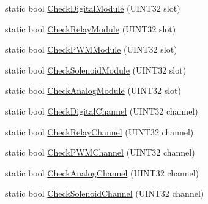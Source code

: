 \begin{DoxyCompactItemize}
\item 
static bool \hyperlink{classSensorBase_a0a3490a89f61ba323a7b1a2a3fe163be}{\-Check\-Digital\-Module} (\-U\-I\-N\-T32 slot)
\item 
static bool \hyperlink{classSensorBase_aa9055a030e59812f3a406c5a41366f23}{\-Check\-Relay\-Module} (\-U\-I\-N\-T32 slot)
\item 
static bool \hyperlink{classSensorBase_ad19aa0ab3feef1999770e986ce157cf2}{\-Check\-P\-W\-M\-Module} (\-U\-I\-N\-T32 slot)
\item 
static bool \hyperlink{classSensorBase_a6e712e05403980ee62ba858f10926496}{\-Check\-Solenoid\-Module} (\-U\-I\-N\-T32 slot)
\item 
static bool \hyperlink{classSensorBase_a4c55295d5a2c87af65e17ebcff40a1d3}{\-Check\-Analog\-Module} (\-U\-I\-N\-T32 slot)
\item 
static bool \hyperlink{classSensorBase_a6b38ec81d351403492b0449dd4615e12}{\-Check\-Digital\-Channel} (\-U\-I\-N\-T32 channel)
\item 
static bool \hyperlink{classSensorBase_af83a99ec4a84a9265a5a077d200c6275}{\-Check\-Relay\-Channel} (\-U\-I\-N\-T32 channel)
\item 
static bool \hyperlink{classSensorBase_ac4319058432968761cd72470b82644ae}{\-Check\-P\-W\-M\-Channel} (\-U\-I\-N\-T32 channel)
\item 
static bool \hyperlink{classSensorBase_a8c15101dc7a785d81eafa22644cdd02e}{\-Check\-Analog\-Channel} (\-U\-I\-N\-T32 channel)
\item 
static bool \hyperlink{classSensorBase_a41deb3044c6a075226fa6e4840265b92}{\-Check\-Solenoid\-Channel} (\-U\-I\-N\-T32 channel)
\end{DoxyCompactItemize}
